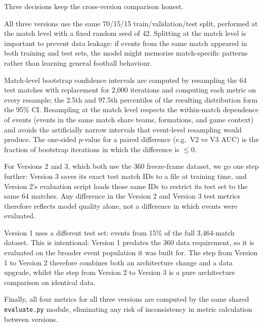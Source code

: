 Three decisions keep the cross-version comparison honest.

All three versions use the same 70/15/15 train/validation/test split, performed at the match level with a fixed random seed of 42. Splitting at the match level is important to prevent data leakage: if events from the same match appeared in both training and test sets, the model might memorise match-specific patterns rather than learning general football behaviour.

Match-level bootstrap confidence intervals are computed by resampling the 64 test matches with replacement for 2,000 iterations and computing each metric on every resample; the 2.5th and 97.5th percentiles of the resulting distribution form the 95\% CI. Resampling at the match level respects the within-match dependence of events (events in the same match share teams, formations, and game context) and avoids the artificially narrow intervals that event-level resampling would produce. The one-sided $p$-value for a paired difference (e.g.\ V2 vs V3 AUC) is the fraction of bootstrap iterations in which the difference is $\leq 0$.

For Versions 2 and 3, which both use the 360 freeze-frame dataset, we go one step further: Version 3 saves its exact test match IDs to a file at training time, and Version 2's evaluation script loads those same IDs to restrict its test set to the same 64 matches. Any difference in the Version 2 and Version 3 test metrics therefore reflects model quality alone, not a difference in which events were evaluated.

Version 1 uses a different test set: events from 15\% of the full 3,464-match dataset. This is intentional: Version 1 predates the 360 data requirement, so it is evaluated on the broader event population it was built for. The step from Version 1 to Version 2 therefore combines both an architecture change and a data upgrade, whilst the step from Version 2 to Version 3 is a pure architecture comparison on identical data.

Finally, all four metrics for all three versions are computed by the same shared \texttt{evaluate.py} module, eliminating any risk of inconsistency in metric calculation between versions.
